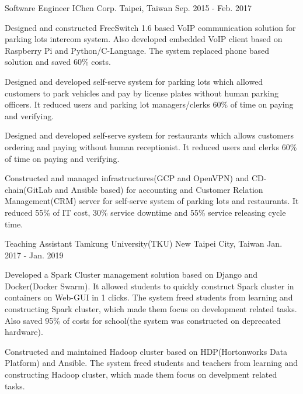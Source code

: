 \begin{cventries}
    \cventry
        {Software Engineer}
        {IChen Corp.}
        {Taipei, Taiwan}
        {Sep. 2015 - Feb. 2017}
        {
            \begin{cvitems}
                \item
                    {
                        Designed and constructed FreeSwitch 1.6 based VoIP communication solution for parking lots intercom system. Also developed embedded VoIP client based on Raspberry Pi and Python/C-Language. The system replaced phone based solution and saved 60\% costs.
                    }
                \item
                    {
                        Designed and developed self-serve system for parking lots which allowed customers to park vehicles and pay by license plates without human parking officers. It reduced users and parking lot managers/clerks 60\% of time on paying and verifying.
                    }
                \item
                    {
                        Designed and developed self-serve system for restaurants which allows customers ordering and paying without human receptionist. It reduced users and clerks 60\% of time on paying and verifying.
                    }
                \item
                    {
                        Constructed and managed infrastructures(GCP and OpenVPN) and CD-chain(GitLab and Ansible based) for accounting and Customer Relation Management(CRM) server for self-serve system of parking lots and restaurants. It reduced 55\% of IT cost, 30\% service downtime and 55\% service releasing cycle time.
                    }
            \end{cvitems}
        }
        
    \cventry
        {Teaching Assistant}
        {Tamkung University(TKU)}
        {New Taipei City, Taiwan}
        {Jan. 2017 - Jan. 2019}
        {
            \begin{cvitems}
                \item
                    {
                        Developed a Spark Cluster management solution based on Django and Docker(Docker Swarm). It allowed students to quickly construct Spark cluster in containers on Web-GUI in 1 clicks. The system freed students from learning and constructing Spark cluster, which made them focus on development related tasks. Also saved 95\% of costs for school(the system was constructed on deprecated hardware).
                    }
                \item
                    {
                        Constructed and maintained Hadoop cluster based on HDP(Hortonworks Data Platform) and Ansible. The system freed students and teachers from learning and constructing Hadoop cluster, which made them focus on develpment related tasks.
                    }
            \end{cvitems}
        }
        

\end{cventries}
